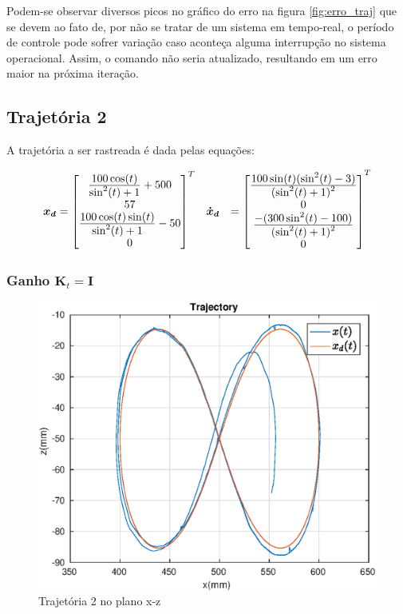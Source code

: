 Podem-se observar diversos picos no gráfico do erro na figura \ref{fig:erro_traj} que se devem ao fato de, por não se tratar de um sistema em tempo-real, o período de controle pode sofrer variação caso aconteça alguma interrupção no sistema operacional. Assim, o comando não seria atualizado, resultando em um erro maior na próxima iteração.


\subsection{Trajetória 2}
A trajetória a ser rastreada é dada pelas equações:


\begin{align}
\bm{x_d} &= \begin{bmatrix} 
\frac{\displaystyle 100 \cos(t)}{\displaystyle \sin^2(t) + 1} + 500 \\
57 \\
\frac{\displaystyle 100\cos(t) \sin(t)}{\displaystyle \sin^2(t) + 1} -50 \\
0
\end{bmatrix}^T  &&
\bm{\dot{x}_d} &= \begin{bmatrix}
\frac{\displaystyle 100\sin(t) (\sin^2(t) -3 )}{\displaystyle (\sin^2(t) + 1)^2} \\
0 \\
\frac{\displaystyle -(300 \sin^2(t) - 100)}{\displaystyle (\sin^2(t) + 1)^2} \\
0\end{bmatrix}^T
\end{align}

\subsubsection{Ganho $\bm{K}_t = \bm{I}$}
\begin{figure}[H]
\centering
  \includegraphics[width=0.5\linewidth]{./img/traj_2_k1/traj.eps}
  \caption{Trajetória 2 no plano x-z}
  \label{fig:sub1}
\end{figure}%

